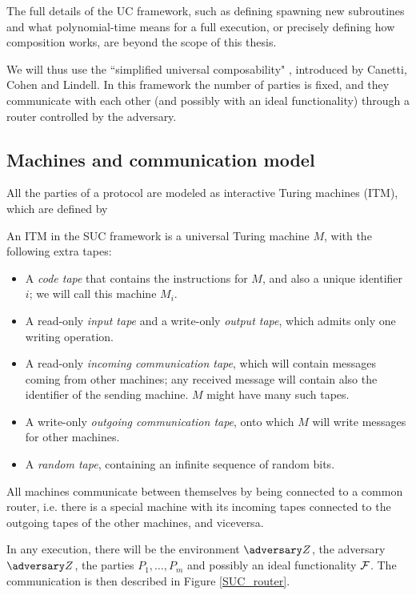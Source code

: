 The full details of the UC framework, such as defining spawning new subroutines and what polynomial-time means for a full execution, or precisely defining how composition works, are beyond the scope of this thesis.

We will thus use the ``simplified universal composability" \cite{Canetti_SUC}, introduced by Canetti, Cohen and Lindell. In this framework the number of parties is fixed, and they communicate with each other (and possibly with an ideal functionality) through a router controlled by the adversary.

\subsection{Machines and communication model}

All the parties of a protocol are modeled as interactive Turing machines (ITM), which are defined by
\begin{definition}
    An ITM in the SUC framework is a universal Turing machine $M$, with the following extra tapes:
    \begin{itemize}
        \item A \emph{code tape} that contains the instructions for $M$, and also a unique identifier $i$; we will call this machine $M_i$.
        \item A read-only \emph{input tape} and a write-only \emph{output tape}, which admits only one writing operation.
        \item A read-only \emph{incoming communication tape}, which will contain messages coming from other machines; any received message will contain also the identifier of the sending machine. $M$ might have many such tapes.
        \item A write-only \emph{outgoing communication tape}, onto which $M$ will write messages for other machines.
        \item A \emph{random tape}, containing an infinite sequence of random bits.
    \end{itemize}
\end{definition}

All machines communicate between themselves by being connected to a common router, i.e. there is a special machine with its incoming tapes connected to the outgoing tapes of the other machines, and viceversa.

In any execution, there will be the environment $\zdv$, the adversary $\zdv$, the parties $P_1,\dots,P_m$ and possibly an ideal functionality $\mathcal{F}$. The communication is then described in Figure \ref{SUC_router}.

